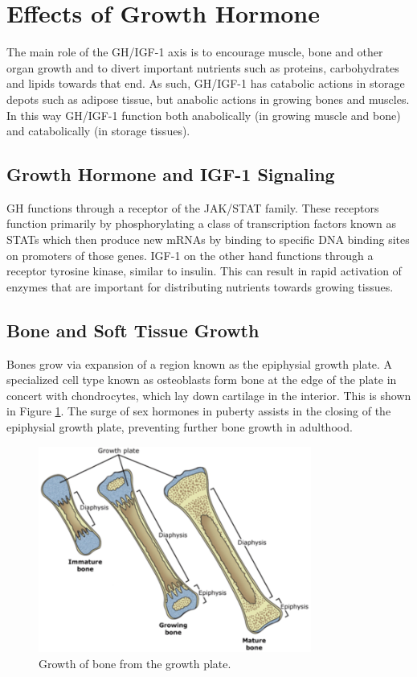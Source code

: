 \documentclass{tufte-handout}
\begin{document}
\section{Effects of Growth Hormone}

The main role of the GH/IGF-1 axis is to encourage muscle, bone and other organ growth and to divert important nutrients such as proteins, carbohydrates and lipids towards that end.  As such, GH/IGF-1 has catabolic actions in storage depots such as adipose tissue, but anabolic actions in growing bones and muscles.  In this way GH/IGF-1 function both anabolically (in growing muscle and bone) and catabolically (in storage tissues).

\subsection{Growth Hormone and IGF-1 Signaling}

GH functions through a receptor of the JAK/STAT family.  These receptors function primarily by phosphorylating a class of transcription factors known as STATs which then produce new mRNAs by binding to specific DNA binding sites on promoters of those genes.  IGF-1 on the other hand functions through a receptor tyrosine kinase, similar to insulin.  This can result in rapid activation of enzymes that are important for distributing nutrients towards growing tissues.

\subsection{Bone and Soft Tissue Growth}

Bones grow via expansion of a region known as the epiphysial growth plate.  A specialized cell type known as osteoblasts form bone at the edge of the plate in concert with chondrocytes, which lay down cartilage in the interior.  This is shown in Figure \ref{fig:bone-growth}.  The surge of sex hormones in puberty assists in the closing of the epiphysial growth plate, preventing further bone growth in adulthood.

\begin{figure}
\centering
  \includegraphics[width=0.8\textwidth]{figures/bone-growth}
  \caption{Growth of bone from the growth plate.}
    \label{fig:bone-growth}
\end{figure}
\end{document}
